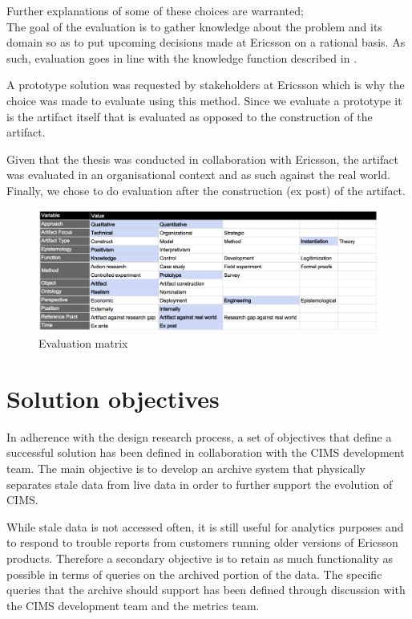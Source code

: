 Further explanations of some of these choices are warranted;\\
The goal of the evaluation is to gather knowledge about the problem and its domain so as to put upcoming decisions made at Ericsson on a rational basis. As such, evaluation goes in line with the knowledge function described in \cite{DesignEval}.

A prototype solution was requested by stakeholders at Ericsson which is why the choice was made to evaluate using this method. Since we evaluate a prototype it is the artifact itself that is evaluated as opposed to the construction of the artifact.

Given that the thesis was conducted in collaboration with Ericsson, the artifact was evaluated in an organisational context and as such against the real world. Finally, we chose to do evaluation after the construction (ex post) of the artifact.

\begin{figure}[h!]
\centering
\includegraphics[width=0.7\pdfpagewidth]{figure/eval.png}
\caption{Evaluation matrix}
\label{fig:matrix}
\end{figure}


\section{Solution objectives}
In adherence with the design research process, a set of objectives that define a successful solution has been defined in collaboration with the CIMS development team. The main objective is to develop an archive system that physically separates stale data from live data in order to further support the evolution of CIMS.

While stale data is not accessed often, it is still useful for analytics purposes and to respond to trouble reports from customers running older versions of Ericsson products. Therefore a secondary objective is to retain as much functionality as possible in terms of queries on the archived portion of the data. The specific queries that the archive should support has been defined through discussion with the CIMS development team and the metrics team.

